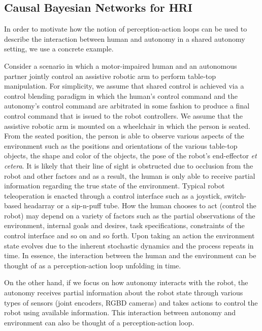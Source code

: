 \documentclass[12pt]{article}
\begin{document}
\subsection{Causal Bayesian Networks for HRI}

In order to motivate how the notion of perception-action loops can be used to describe the interaction between human and autonomy in a shared autonomy setting, we use a concrete example.

Consider a scenario in which a motor-impaired human and an autonomous partner jointly control an assistive robotic arm to perform table-top manipulation. For simplicity, we assume that shared control is achieved via a control blending paradigm in which the human's control command and the autonomy's control command are arbitrated in some fashion to produce a final control command that is issued to the robot controllers. We assume that the assistive robotic arm is mounted on a wheelchair in which the person is seated. From the seated position, the person is able to observe various aspects of the environment such as the positions and orientations of the various table-top objects, the shape and color of the objects, the pose of the robot's end-effector \textit{et cetera}. It is likely that their line of sight is obstructed due to occlusion from the robot and other factors and as a result, the human is only able to receive partial information regarding the true state of the environment. Typical robot teleoperation is enacted through a control interface such as a joystick, switch-based headarray or a sip-n-puff tube. How the human chooses to act (control the robot) may depend on a variety of factors such as the partial observations of the environment, internal goals and desires, task specifications, constraints of the control interface and so on and so forth. Upon taking an action the environment state evolves due to the inherent stochastic dynamics and the process repeats in time. In essence, the interaction between the human and the environment can be thought of as a perception-action loop unfolding in time. 

On the other hand, if we focus on how autonomy interacts with the robot, the autonomy receives partial information about the robot state through various types of sensors (joint encoders, RGBD cameras) and takes actions to control the robot using available information. This interaction between autonomy and environment can also be thought of a perception-action loop.
\end{document}
